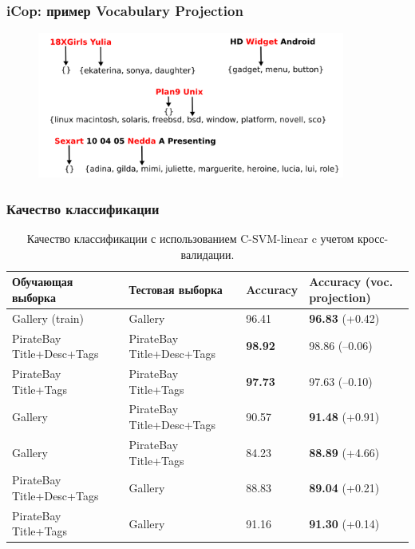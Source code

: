 \begin{frame}[fragile]
\frametitle{iCop: пример Vocabulary Projection}

\begin{figure}
\center
\includegraphics[width=0.9\textwidth]{./vp-ex}
\end{figure}



\end{frame}


\begin{frame}
\frametitle{Качество классификации}
\begin{table}
\tiny

\centering
\begin{tabular}{|l|l|l|l|}

\hline
\bf Обучающая выборка & \bf Тестовая выборка & \bf Accuracy  &
\textbf{Accuracy (voc. projection)} \\ \hline

Gallery (train) & Gallery  & 96.41 & \textbf{96.83} (+0.42) \\
PirateBay Title+Desc+Tags & PirateBay Title+Desc+Tags &  \textbf{98.92} &  98.86 (--0.06)\\
PirateBay Title+Tags & PirateBay Title+Tags & \textbf{97.73} & 97.63 (--0.10) \\
Gallery & PirateBay Title+Desc+Tags & 90.57 & \textbf{91.48} (+0.91) \\
\alert{Gallery}  & \alert{PirateBay Title+Tags}  & \alert{84.23} & \alert{\textbf{88.89}} \alert{(+4.66)} \\
PirateBay Title+Desc+Tags & Gallery  & 88.83 & \textbf{89.04} (+0.21) \\
PirateBay Title+Tags & Gallery & 91.16 & \textbf{91.30} (+0.14) \\
\hline

\end{tabular}
\caption{ Качество классификации с использованием C-SVM-linear c учетом
кросс-валидации.
}
\label{tbl:results2}

\end{table}
\end{frame}




